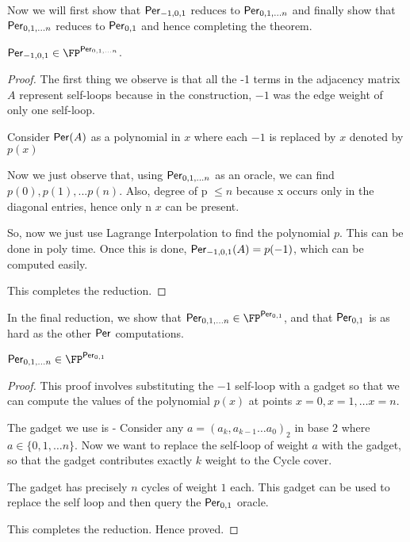 Now we will first show that ${\sf Per}_{-1,0,1}$ reduces to ${\sf Per}_{0,1,\dots n}$ and finally show that ${\sf Per}_{0,1,\dots n}$ reduces to ${\sf Per}_{0,1}$ and hence completing the theorem.

\begin{theorem}
$\per_{-1,0,1} \in \FP^{\per_{0,1,\dots n}}$.
\end{theorem}
\begin{proof}
 The first thing we observe is that all the -1 terms in the adjacency matrix $A$ represent self-loops because in the construction, $-1$ was the edge weight of only one self-loop.
 
 Consider ${\sf Per}(A)$ as a polynomial in $x$ where each $-1$ is replaced by $x$ denoted by $p(x)$ 
 
 Now we just observe that, using ${{\sf Per}_{0,1,\dots n}}$ as an oracle, we can find $p(0), p(1), ... p(n)$. Also, degree of p $\leq n$ because x occurs only in the diagonal entries, hence only n $x $ can be present. 
 
 So, now we just use Lagrange Interpolation to find the polynomial $p$. This can be done in poly time. Once this is done, ${\sf Per}_{-1,0,1}(A) = p(-1)$, which can be computed easily.
 
 This completes the reduction.
\end{proof}

In the final reduction, we show that $\per_{0,1,\dots n} \in \FP^{\per_{0,1}}$, and that ${\sf Per}_{0,1}$ is as hard as the other ${\sf Per}$ computations. 

\begin{theorem}
$\per_{0,1,\dots n} \in \FP^{\per_{0,1}}$
\end{theorem}
\begin{proof}
This proof involves substituting the $-1$ self-loop with a gadget so that we can compute the values of the polynomial $p(x)$ at points $x=0, x=1, \dots x=n$.

The gadget we use is - 
Consider any $a = (a_k, a_{k-1}\dots a_{0})_2$ in base $2$ where $a\in \{0, 1, \dots n\}$. Now we want to replace the self-loop of weight $a$ with the gadget, so that the gadget contributes exactly $k$ weight to the Cycle cover. 

\begin{figure}[ht!]
\end{figure}

The gadget has precisely $n$ cycles of weight $1$ each. This gadget can be used to replace the self loop and then query the ${\sf Per}_{0,1}$ oracle. 

This completes the reduction. Hence proved.
\end{proof}

